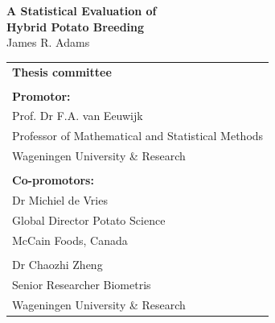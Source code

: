 \thispagestyle{empty}
\begin{center}
\Huge{\textbf{A Statistical Evaluation of}} \\
\Huge{\textbf{Hybrid Potato Breeding}} \\
\vspace*{1cm}
\vspace*{1cm}
\vspace*{\fill}
\large{James R. Adams}\\
\end{center}

\newpage
\thispagestyle{empty}
\vspace*{\fill}
\begin{tabular}{l}
    \textbf{Thesis committee}                                                                 \\  
                                                                                              \\  
    \textbf{Promotor:}                                                                        \\  
    Prof. Dr F.A. van Eeuwijk \\
    Professor of Mathematical and Statistical Methods \\  
    Wageningen University \& Research                                                                    \\  
                                                                                              \\  
    \textbf{Co-promotors:}                                                                    \\  
    Dr Michiel de Vries                                                                   \\  
    Global Director Potato Science              \\  
    McCain Foods, Canada                                                               \\  
\\
    Dr Chaozhi Zheng                                                                      \\  
    Senior Researcher Biometris                                                                       \\  
    Wageningen University \& Research                                                          \\

\end{tabular}
